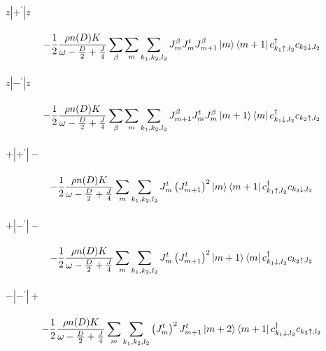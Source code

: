 \documentclass[12pt]{revtex4-2}
\begin{document}
\paragraph{\(z|+^\prime|z\)}
\begin{equation}\begin{aligned}
	-\frac{1}{2}\frac{\rho n(D) K}{\omega - \frac{D}{2} + \frac{J}{4}}\sum_\beta \sum_{m}\sum_{k_1,k_2,l_2}J^\beta_m J^t_m J^\beta_{m+1}\ket{m}\bra{m+1}c^\dagger_{k_1 \uparrow, l_2}c_{k_2 \downarrow,l_2}
\end{aligned}\end{equation}

\paragraph{\(z|-^\prime|z\)}
\begin{equation}\begin{aligned}
	-\frac{1}{2}\frac{\rho n(D) K}{\omega - \frac{D}{2} + \frac{J}{4}}\sum_\beta \sum_{m}\sum_{k_1,k_2,l_2} J^\beta_{m+1} J^t_m J^\beta_m \ket{m+1}\bra{m}c^\dagger_{k_1 \downarrow, l_2}c_{k_2 \uparrow,l_2}
\end{aligned}\end{equation}

\paragraph{\(+|+^\prime|-\)}
\begin{equation}\begin{aligned}
	-\frac{1}{2}\frac{\rho n(D) K}{\omega - \frac{D}{2} + \frac{J}{4}}\sum_{m}\sum_{k_1,k_2,l_2} J^t_m \left( J^t_{m+1} \right)^2 \ket{m}\bra{m+1}c^\dagger_{k_1 \uparrow, l_2}c_{k_2 \downarrow,l_2}
\end{aligned}\end{equation}
\paragraph{\(+|-^\prime|-\)}
\begin{equation}\begin{aligned}
	-\frac{1}{2}\frac{\rho n(D) K}{\omega - \frac{D}{2} + \frac{J}{4}}\sum_{m}\sum_{k_1,k_2,l_2} J^t_m \left( J^t_{m+1} \right)^2 \ket{m+1}\bra{m}c^\dagger_{k_1 \downarrow, l_2}c_{k_2 \uparrow,l_2}
\end{aligned}\end{equation}
\paragraph{\(-|-^\prime|+\)}
\begin{equation}\begin{aligned}
	-\frac{1}{2}\frac{\rho n(D) K}{\omega - \frac{D}{2} + \frac{J}{4}}\sum_{m}\sum_{k_1,k_2,l_2} \left( J^t_{m} \right)^2 J^t_{m+1}\ket{m+2}\bra{m+1}c^\dagger_{k_1 \downarrow, l_2}c_{k_2 \uparrow,l_2}
\end{aligned}\end{equation}
\end{document}
